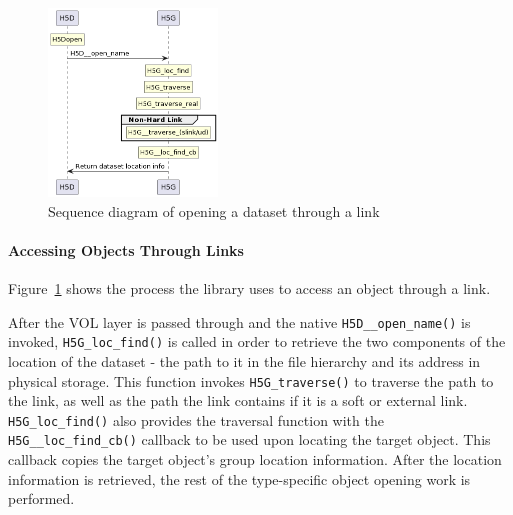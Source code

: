 \begin{figure}
    \centering
    \includegraphics[width=0.40\textwidth]{images/tour_4_uml_link_access.png}
    \caption{Sequence diagram of opening a dataset through a link}
    \label{fig:tour-4-uml-link-access}
\end{figure}

\paragraph{Accessing Objects Through Links} Figure~\ref{fig:tour-4-uml-link-access} shows the process the library uses to access an object through a link. 

After the VOL layer is passed through and the native \texttt{H5D\_\_open\_name()} is invoked, \texttt{H5G\_loc\_find()} is called in order to retrieve the two components of the location of the dataset - the path to it in the file hierarchy and its address in physical storage. This function invokes \texttt{H5G\_traverse()} to traverse the path to the link, as well as the path the link contains if it is a soft or external link. \texttt{H5G\_loc\_find()} also provides the traversal function with the \texttt{H5G\_\_loc\_find\_cb()} callback to be used upon locating the target object. This callback copies the target object's group location information. After the location information is retrieved, the rest of the type-specific object opening work is performed. 

